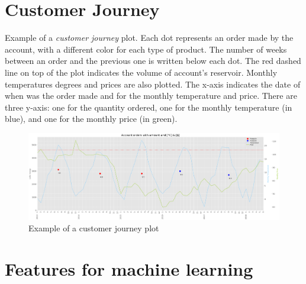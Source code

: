 \appendix

\chapter{Customer Journey}

Example of a \textit{customer journey} plot. Each dot represents an order made by the account, with a different color for each type of product. The number of weeks between an order and the previous one is written below each dot. The red dashed line on top of the plot indicates the volume of account's reservoir. Monthly temperatures degrees and prices are also plotted. The x-axis indicates the date of when was the order made and for the monthly temperature and price. There are three y-axis: one for the quantity ordered, one for the monthly temperature (in blue), and one for the monthly price (in green). \\

\begin{figure}[htbp]
    \centering
    \hspace*{-2.5cm}
    \includegraphics[width=19cm]{images/customer-journey_2.png}
    \caption{Example of a customer journey plot}
    \label{fig-annex:customer-journey}
\end{figure}


\chapter{Features for machine learning}
\label{annex:features-for-ml}

